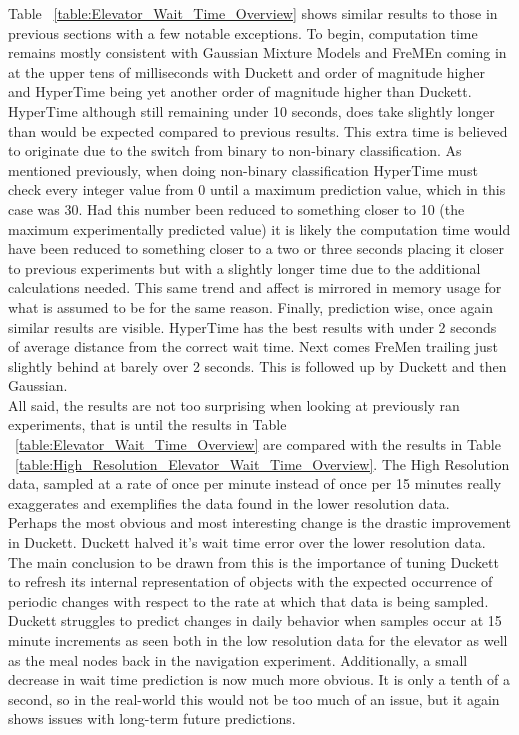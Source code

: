 Table ~\ref{table:Elevator_Wait_Time_Overview} shows similar results to those
in previous sections with a few notable exceptions. To begin, computation time
remains mostly consistent with Gaussian Mixture Models and FreMEn coming in at
the upper tens of milliseconds with Duckett and order of magnitude higher and
HyperTime being yet another order of magnitude higher than Duckett. HyperTime
although still remaining under 10 seconds, does take slightly longer than would
be expected compared to previous results. This extra time is believed to originate
due to the switch from binary to non-binary classification. As mentioned previously,
when doing non-binary classification HyperTime must check every integer value
from 0 until a maximum prediction value, which in this case was 30. Had this
number been reduced to something closer to 10 (the maximum experimentally
predicted value) it is likely the computation time would have been reduced to
something closer to a two or three seconds placing it closer to previous
experiments but with a slightly longer time due to the additional calculations
needed. This same trend and affect is mirrored in memory usage for what is
assumed to be for the same reason. Finally, prediction wise, once again
similar results are visible. HyperTime has the best results with under 2
seconds of average distance from the correct wait time. Next comes FreMen
trailing just slightly behind at barely over 2 seconds. This is followed up
by Duckett and then Gaussian. \\

All said, the results are not too surprising when looking at previously ran
experiments, that is until the results in Table
~\ref{table:Elevator_Wait_Time_Overview} are compared with the results in Table
~\ref{table:High_Resolution_Elevator_Wait_Time_Overview}. The High Resolution
data, sampled at a rate of once per minute instead of once per 15 minutes really
exaggerates and exemplifies the data found in the lower resolution data. \\

Perhaps the most obvious and most interesting change is the drastic improvement
in Duckett. Duckett halved it's wait time error over the lower resolution data.
The main conclusion to be drawn from this is the importance of tuning Duckett
to refresh its internal representation of objects with the expected occurrence
of periodic changes with respect to the rate at which that data is being
sampled. Duckett struggles to predict changes in daily behavior when samples
occur at 15 minute increments as seen both in the low resolution data for the
elevator as well as the meal nodes back in the navigation experiment.
Additionally, a small decrease in wait time prediction is now much more obvious.
It is only a tenth of a second, so in the real-world this would not be too much
of an issue, but it again shows issues with long-term future predictions.

